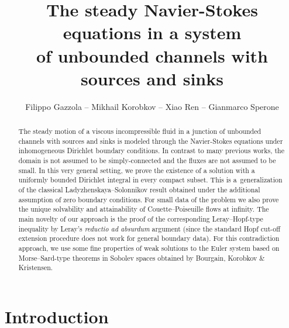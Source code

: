 \documentclass[11pt]{article}
\date{}
\numberwithin{equation}{section}
\numberwithin{figure}{section}
\begin{document}
\title{The steady Navier-Stokes equations in a system\\  of unbounded channels with sources and sinks}
\author{Filippo Gazzola -- Mikhail Korobkov -- Xiao Ren -- Gianmarco Sperone }
\maketitle

\begin{abstract}
\noindent	
The steady motion of a viscous incompressible fluid in a junction of unbounded channels with sources and sinks is modeled through the Navier-Stokes equations under inhomogeneous Dirichlet boundary conditions. In contrast to many previous works, the domain is not assumed to be simply-connected and the fluxes are not assumed to be small. In this very general setting, we prove the existence of a solution with a
uniformly bounded Dirichlet integral in every compact subset. This is a~generalization of the classical Ladyzhenskaya--Solonnikov result obtained under the additional assumption of zero boundary conditions.
 For small data of the problem we also prove the unique solvability and attainability of Couette--Poiseuille flows at infinity. The main novelty of our approach is the proof of the corresponding  Leray--Hopf-type inequality by 
Leray's  \textit{reductio ad absurdum} argument
(since the standard Hopf cut-off extension procedure does not work for general boundary data). For this contradiction approach, we use some fine properties of weak solutions to the Euler system based on Morse--Sard-type theorems in Sobolev spaces obtained by
Bourgain, Korobkov \& Kristensen.
\end{abstract}

\tableofcontents

\section{Introduction}
\end{document}
